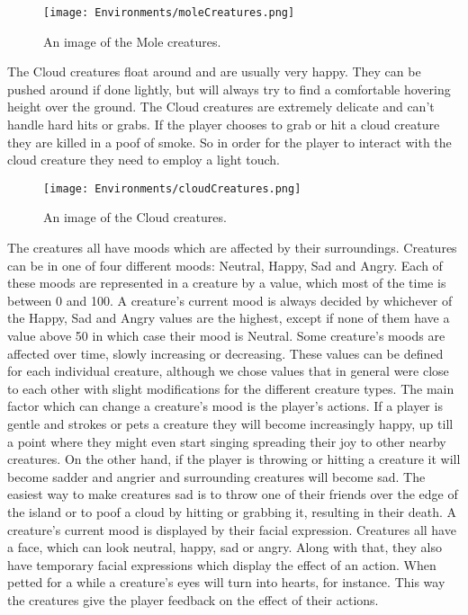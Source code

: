 \begin{figure}[h]
\centering
\texttt{[image: Environments/moleCreatures.png]}
\caption{An image of the Mole creatures.}
\label{fig:moleCreatures}
\end{figure}

The Cloud creatures float around and are usually very happy. They can be pushed around if done lightly, but will always try to find a comfortable hovering height over the ground. The Cloud creatures are extremely delicate and can't handle hard hits or grabs. If the player chooses to grab or hit a cloud creature they are killed in a poof of smoke. So in order for the player to interact with the cloud creature they need to employ a light touch.

\begin{figure}[h]
\centering
\texttt{[image: Environments/cloudCreatures.png]}
\caption{An image of the Cloud creatures.}
\label{fig:cloudCreatures}
\end{figure}

The creatures all have moods which are affected by their surroundings. Creatures can be in one of four different moods: Neutral, Happy, Sad and Angry. Each of these moods are represented in a creature by a value, which most of the time is between 0 and 100. A creature's current mood is always decided by whichever of the Happy, Sad and Angry values are the highest, except if none of them have a value above 50 in which case their mood is Neutral. Some creature's moods are affected over time, slowly increasing or decreasing. These values can be defined for each individual creature, although we chose values that in general were close to each other with slight modifications for the different creature types. The main factor which can change a creature's mood is the player's actions. If a player is gentle and strokes or pets a creature they will become increasingly happy, up till a point where they might even start singing spreading their joy to other nearby creatures. On the other hand, if the player is throwing or hitting a creature it will become sadder and angrier and surrounding creatures will become sad. The easiest way to make creatures sad is to throw one of their friends over the edge of the island or to poof a cloud by hitting or grabbing it, resulting in their death. A creature's current mood is displayed by their facial expression. Creatures all have a face, which can look neutral, happy, sad or angry. Along with that, they also have temporary facial expressions which display the effect of an action. When petted for a while a creature's eyes will turn into hearts, for instance. This way the creatures give the player feedback on the effect of their actions.

